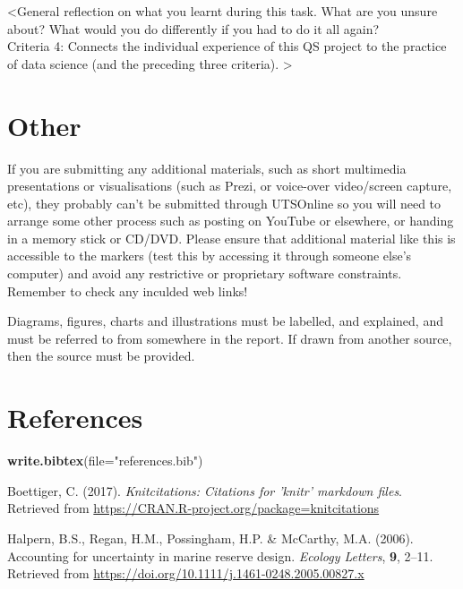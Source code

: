\documentclass[]{article}
\newenvironment{Shaded}{\begin{snugshade}}{\end{snugshade}}
\newcommand{\DataTypeTok}[1]{\textcolor[rgb]{0.13,0.29,0.53}{#1}}
\newcommand{\KeywordTok}[1]{\textcolor[rgb]{0.13,0.29,0.53}{\textbf{#1}}}
\newcommand{\NormalTok}[1]{#1}
\newcommand{\StringTok}[1]{\textcolor[rgb]{0.31,0.60,0.02}{#1}}
\begin{document}
\textless General reflection on what you learnt during this task. What
are you unsure about? What would you do differently if you had to do it
all again?\\
Criteria 4: Connects the individual experience of this QS project to the
practice of data science (and the preceding three criteria).
\textgreater{}

\hypertarget{other}{%
\section{Other}\label{other}}

If you are submitting any additional materials, such as short multimedia
presentations or visualisations (such as Prezi, or voice-over
video/screen capture, etc), they probably can't be submitted through
UTSOnline so you will need to arrange some other process such as posting
on YouTube or elsewhere, or handing in a memory stick or CD/DVD. Please
ensure that additional material like this is accessible to the markers
(test this by accessing it through someone else's computer) and avoid
any restrictive or proprietary software constraints. Remember to check
any inculded web links!

Diagrams, figures, charts and illustrations must be labelled, and
explained, and must be referred to from somewhere in the report. If
drawn from another source, then the source must be provided.

\hypertarget{references}{%
\section{References}\label{references}}

\begin{Shaded}
\begin{Highlighting}[]
  \KeywordTok{write.bibtex}\NormalTok{(}\DataTypeTok{file=}\StringTok{"references.bib"}\NormalTok{)}
\end{Highlighting}
\end{Shaded}

\hypertarget{refs}{}
\leavevmode\hypertarget{ref-Boettiger_2017}{}%
Boettiger, C. (2017). \emph{Knitcitations: Citations for 'knitr'
markdown files}. Retrieved from
\url{https://CRAN.R-project.org/package=knitcitations}

\leavevmode\hypertarget{ref-Halpern_2006}{}%
Halpern, B.S., Regan, H.M., Possingham, H.P. \& McCarthy, M.A. (2006).
Accounting for uncertainty in marine reserve design. \emph{Ecology
Letters}, \textbf{9}, 2--11. Retrieved from
\url{https://doi.org/10.1111/j.1461-0248.2005.00827.x}
\end{document}
